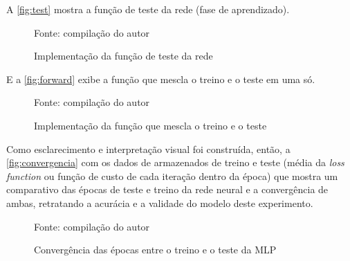 A \autoref{fig:test} mostra a função de teste da rede (fase de aprendizado). 
\begin{figure}[H]
	\centering
	\caption{Implementação da função de teste da rede}
	
	\label{fig:test}
	{\scriptsize Fonte: compilação do autor}
\end{figure}
E a \autoref{fig:forward} exibe a função que mescla o treino e o teste em uma só.
\begin{figure}[H]
	\centering
	\caption{Implementação da função que mescla o treino e o teste}
	
	\label{fig:forward}
	{\scriptsize Fonte: compilação do autor}
\end{figure}

Como esclarecimento e interpretação visual foi construída, então, a \autoref{fig:convergencia} com os dados de armazenados de treino e teste (média da \textit{loss function} ou função de custo de cada iteração dentro da época) que mostra um comparativo das épocas de teste e treino da rede neural e a convergência de ambas, retratando a acurácia e a validade do modelo deste experimento.

\begin{figure}[H]
	\centering
	\caption{Convergência das épocas entre o treino e o teste da MLP}
	
	\label{fig:convergencia}
	{\scriptsize Fonte: compilação do autor}
\end{figure}

